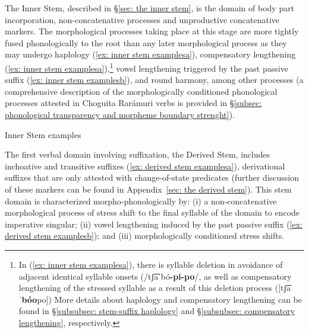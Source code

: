 The Inner Stem, described in §\ref{sec: the inner stem}, is the domain of body part incorporation, non-concatenative processes and unproductive concatenative markers. The morphological processes taking place at this stage are more tightly fused phonologically to the root than any later morphological process as they may undergo haplology (\ref{ex: inner stem examplesa}), compensatory lengthening (\ref{ex: inner stem examplesa}),\footnote{In (\ref{ex: inner stem examplesa}), there is syllable deletion in avoidance of adjacent identical syllable onsets (/tʃ͡aˈbó\textbf{-pi-po}/, as well as compensatory lengthening of the stressed syllable as a result of this deletion process ([tʃ͡a\textbf{ˈbóo}po]) More details about haplology and compensatory lengthening can be found in §\ref{subsubsec: stem-suffix haplology} and §\ref{subsubsec: compensatory lengthening}, respectively.} vowel lengthening triggered by the past passive suffix (\ref{ex: inner stem examplesb}), and round harmony, among other processes (a comprehensive description of the morphologically conditioned phonological processes attested in Choguita Rarámuri verbs is provided in §\ref{subsec: phonological transparency and morpheme boundary strenght}).

\ea\label{ex: inner stem examples}
{Inner Stem examples}

    \label{ex: inner stem examplesa}
        \label{ex: inner stem examplesb}
    \z
\z

The first verbal domain involving suffixation, the Derived Stem, includes inchoative and transitive suffixes (\ref{ex: derived stem examplesa}), derivational suffixes that are only attested with change-of-state predicates (further discussion of these markers can be found in Appendix~\ref{sec: the derived stem}). This stem domain is characterized morpho-phonologically by: (i) a non-concatenative morphological process of stress shift to the final syllable of the domain to encode imperative singular; (ii) vowel lengthening induced by the past passive suffix (\ref{ex: derived stem examplesb}); and (iii) morphologically conditioned stress shifts.


